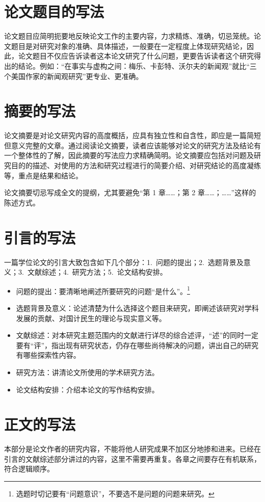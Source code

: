 \documentclass[type = bachelor]{whu-thesis}
\begin{document}
\section{论文题目的写法}
论文题目应简明扼要地反映论文工作的主要内容，力求精炼、准确，切忌笼统。论文题目是对研究对象的准确、具体描述，一般要在一定程度上体现研究结论，因此，论文题目不仅应告诉读者这本论文研究了什么问题，更要告诉读者这个研究得出的结论。例如：“在事实与虚构之间：梅乐、卡彭特、沃尔夫的新闻观”就比“三个美国作家的新闻观研究”更专业、更准确。

\section{摘要的写法}
论文摘要是对论文研究内容的高度概括，应具有独立性和自含性，即应是一篇简短但意义完整的文章。通过阅读论文摘要，读者应该能够对论文的研究方法及结论有一个整体性的了解，因此摘要的写法应力求精确简明。论文摘要应包括对问题及研究目的的描述、对使用的方法和研究过程进行的简要介绍、对研究结论的高度凝练等，重点是结果和结论。

论文摘要切忌写成全文的提纲，尤其要避免“第 1 章……；第 2 章……；……”这样的陈述方式。

\section{引言的写法}
一篇学位论文的引言大致包含如下几个部分：1.~问题的提出；2.~选题背景及意义；3.~文献综述；4.~研究方法；5.~论文结构安排。
\begin{itemize}
    \item 问题的提出：要清晰地阐述所要研究的问题“是什么”。\footnote{选题时切记要有“问题意识”，不要选不是问题的问题来研究。}
    \item 选题背景及意义：论述清楚为什么选择这个题目来研究，即阐述该研究对学科发展的贡献、对国计民生的理论与现实意义等。
    \item 文献综述：对本研究主题范围内的文献进行详尽的综合述评，“述”的同时一定要有“评”，指出现有研究状态，仍存在哪些尚待解决的问题，讲出自己的研究有哪些探索性内容。
    \item 研究方法：讲清论文所使用的学术研究方法。
    \item 论文结构安排：介绍本论文的写作结构安排。
\end{itemize}

\section{正文的写法}
本部分是论文作者的研究内容，不能将他人研究成果不加区分地掺和进来。已经在引言的文献综述部分讲过的内容，这里不需要再重复。各章之间要存在有机联系，符合逻辑顺序。
\end{document}
